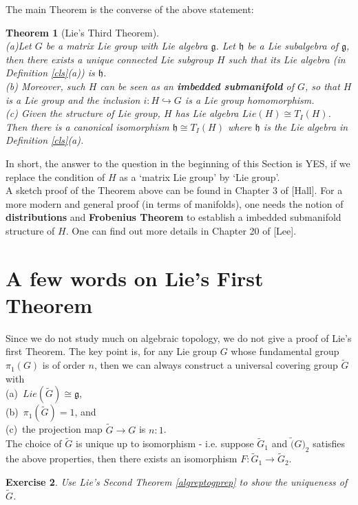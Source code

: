 \documentclass[11pt]{book}
\newtheorem{theorem}{Theorem}[section]
\newtheorem{exercise}[theorem]{Exercise}
\newcommand{\mf}[1]{\mathfrak{#1}}
\begin{document}
The main Theorem is the converse of the above statement:
\begin{theorem}[Lie's Third Theorem] \mbox{}\\
(a)Let $G$ be a matrix Lie group with Lie algebra $\mf{g}$. Let $\mf{h}$ be a Lie subalgebra of $\mf{g}$, then there exists a unique connected Lie subgroup $H$ such that its \textit{Lie algebra} (in Definition \ref{cls}(a)) is $\mf{h}$.\\
(b) Moreover, such $H$ can be seen as an \textbf{imbedded submanifold} of $G$, so that $H$ is a Lie group and the inclusion $i: H \hookrightarrow G$ is a Lie group homomorphism.\\
(c) Given the structure of Lie group, $H$ has Lie algebra $Lie(H) \cong T_I(H)$. Then there is a canonical isomorphism $\mf{h} \cong T_I(H)$ where $\mf{h}$ is the Lie algebra in Definition \ref{cls}(a).
\end{theorem}
In short, the answer to the question in the beginning of this Section is YES, if we replace the condition of $H$ as a `matrix Lie group' by `Lie group'.\\

A sketch proof of the Theorem above can be found in Chapter 3 of [Hall]. For a more modern and general proof (in terms of manifolds), one needs the notion of \textbf{distributions} and \textbf{Frobenius Theorem} to establish a imbedded submanifold structure of $H$. One can find out more details in Chapter 20 of [Lee].

\section{A few words on Lie's First Theorem}
Since we do not study much on algebraic topology, we do not give a proof of Lie's first Theorem. The key point is, for any Lie group $G$ whose fundamental group $\pi_1(G)$ is of order $n$, then we can always construct a universal covering group $\tilde{G}$ with\\
(a)\ $Lie(\tilde{G}) \cong \mf{g}$,\\
(b)\ $\pi_1(\tilde{G}) = 1$, and\\
(c)\ the projection map $\tilde{G} \to G$ is $n:1$.\\
The choice of $\tilde{G}$ is unique up to isomorphism - i.e. suppose $\tilde{G}_1$ and $\tilde(G)_2$ satisfies the above properties, then there exists an isomorphism $F: \tilde{G}_1 \to \tilde{G}_2$.
\begin{exercise}
Use Lie's Second Theorem \ref{algreptogprep} to show the uniqueness of $\tilde{G}$.
\end{exercise}
\end{document}
